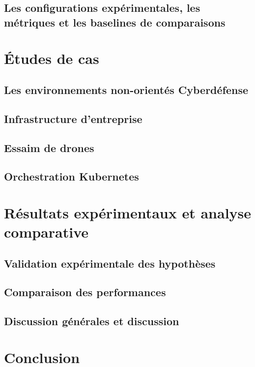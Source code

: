 \documentclass[ twoside,openright,titlepage,numbers=noenddot,headinclude,%
                footinclude=true,cleardoublepage=empty,abstractoff, %
                BCOR=5mm,paper=a4,fontsize=11pt,%
                french,american,%
                ]{scrreprt}
\begin{document}
\section{Les configurations expérimentales, les métriques et les baselines de comparaisons}

\chapter{Études de cas}
\section{Les environnements non-orientés Cyberdéfense}
\section{Infrastructure d'entreprise}
\section{Essaim de drones}
\section{Orchestration Kubernetes}

\chapter{Résultats expérimentaux et analyse comparative}
\section{Validation expérimentale des hypothèses}
\section{Comparaison des performances}
\section{Discussion générales et discussion}

\chapter*{Conclusion}

\cleardoublepage
{}
{}
\end{document}
